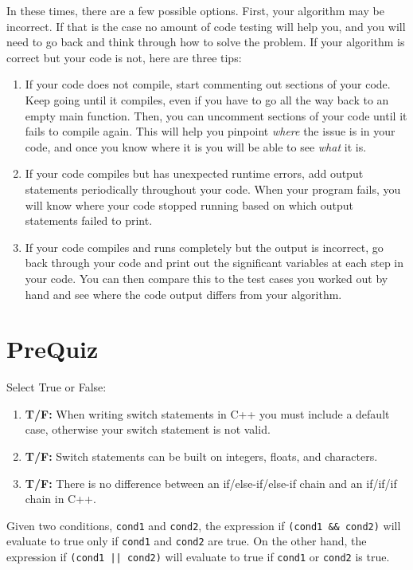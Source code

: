 In these times, there are a few possible options. First, your algorithm may be incorrect. If that is the case no amount of code testing will help you, and you will need to go back and think through how to solve the problem. If your algorithm is correct but your code is not, here are three tips:
\begin{enumerate}
    \item If your code does not compile, start commenting out sections of your code. Keep going until it compiles, even if you have to go all the way back to an empty main function. Then, you can uncomment sections of your code until it fails to compile again. This will help you pinpoint \textit{where} the issue is in your code, and once you know where it is you will be able to see \textit{what} it is. 
    \item If your code compiles but has unexpected runtime errors, add output statements periodically throughout your code. When your program fails, you will know where your code stopped running based on which output statements failed to print.
    \item If your code compiles and runs completely but the output is incorrect, go back through your code and print out the significant variables at each step in your code. You can then compare this to the test cases you worked out by hand and see where the code output differs from your algorithm.
\end{enumerate}

\section{PreQuiz}

\begin{problem}
    Select True or False:
    \begin{enumerate}[label=\Alph*)]
        \item \textbf{T/F:} When writing switch statements in C++ you must include a default case, otherwise your switch statement is not valid.
        \item \textbf{T/F:} Switch statements can be built on integers, floats, and characters.
        \item \textbf{T/F:} There is no difference between an if/else-if/else-if chain and an if/if/if chain in C++.
    \end{enumerate}
\end{problem}

\begin{problem}
    Given two conditions, \texttt{cond1} and \texttt{cond2}, the expression if \texttt{(cond1 && cond2)} will evaluate to true only if \textunderscore \textunderscore \textunderscore \textunderscore \textunderscore \texttt{cond1} and \texttt{cond2} are true. On the other hand, the expression if \texttt{(cond1 || cond2)} will evaluate to true if \textunderscore \textunderscore \textunderscore \textunderscore \textunderscore \texttt{cond1} or \texttt{cond2} is true.
\end{problem}

